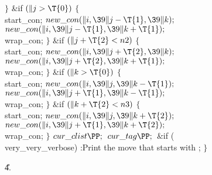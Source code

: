 \4${}\}{}$\2\6
\&{if} ${}(\|j>\T{0}){}$\5
${}\{{}$\1\6
\\{start\_con};\6
${}\\{new\_con}(\|i,\39\|j-\T{1},\39\|k);{}$\6
${}\\{new\_con}(\|i,\39\|j-\T{1},\39\|k+\T{1});{}$\6
\\{wrap\_con};\6
\4${}\}{}$\2\6
\&{if} ${}(\|j+\T{2}<\\{n2}){}$\5
${}\{{}$\1\6
\\{start\_con};\6
${}\\{new\_con}(\|i,\39\|j+\T{2},\39\|k);{}$\6
${}\\{new\_con}(\|i,\39\|j+\T{2},\39\|k+\T{1});{}$\6
\\{wrap\_con};\6
\4${}\}{}$\2\6
\&{if} ${}(\|k>\T{0}){}$\5
${}\{{}$\1\6
\\{start\_con};\6
${}\\{new\_con}(\|i,\39\|j,\39\|k-\T{1});{}$\6
${}\\{new\_con}(\|i,\39\|j+\T{1},\39\|k-\T{1});{}$\6
\\{wrap\_con};\6
\4${}\}{}$\2\6
\&{if} ${}(\|k+\T{2}<\\{n3}){}$\5
${}\{{}$\1\6
\\{start\_con};\6
${}\\{new\_con}(\|i,\39\|j,\39\|k+\T{2});{}$\6
${}\\{new\_con}(\|i,\39\|j+\T{1},\39\|k+\T{2});{}$\6
\\{wrap\_con};\6
\4${}\}{}$\2\6
${}\\{cur\_clist}\PP;{}$\6
${}\\{cur\_tag}\PP;{}$\6
\&{if} (\\{very\_very\_verbose})\1\5
:Print the move that starts with \X;\2\6
\4${}\}{}$\2\2\2\par
\U4.\fi

